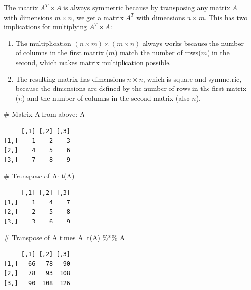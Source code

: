 \documentclass[
  letterpaper,
  DIV=11,
  numbers=noendperiod]{scrartcl}
\newenvironment{Shaded}{\begin{snugshade}}{\end{snugshade}}
\newcommand{\CommentTok}[1]{\textcolor[rgb]{0.37,0.37,0.37}{#1}}
\newcommand{\FunctionTok}[1]{\textcolor[rgb]{0.28,0.35,0.67}{#1}}
\newcommand{\NormalTok}[1]{\textcolor[rgb]{0.00,0.23,0.31}{#1}}
\newcommand{\SpecialCharTok}[1]{\textcolor[rgb]{0.37,0.37,0.37}{#1}}
\begin{document}
The matrix \(A^T \times A\) is always symmetric because by transposing
any matrix \(A\) with dimensions \(m \times n\), we get a matrix \(A^T\)
with dimensions \(n \times m\). This has two implications for
multiplying \(A^T \times A\):

\begin{enumerate}
\def\labelenumi{\arabic{enumi}.}
\item
  The multiplication \((n \times m) \times (m \times n)\) always works
  because the number of columns in the first matrix (\(m\)) match the
  number of rows(\(m\)) in the second, which makes matrix multiplication
  possible.
\item
  The resulting matrix has dimensions \(n \times n\), which is square
  and symmetric, because the dimensions are defined by the number of
  rows in the first matrix (\(n\)) and the number of columns in the
  second matrix (also \(n\)).
\end{enumerate}

\begin{Shaded}
\begin{Highlighting}[]
\CommentTok{\# Matrix A from above:}
\NormalTok{A}
\end{Highlighting}
\end{Shaded}

\begin{verbatim}
     [,1] [,2] [,3]
[1,]    1    2    3
[2,]    4    5    6
[3,]    7    8    9
\end{verbatim}

\begin{Shaded}
\begin{Highlighting}[]
\CommentTok{\# Transpose of A:}
\FunctionTok{t}\NormalTok{(A)}
\end{Highlighting}
\end{Shaded}

\begin{verbatim}
     [,1] [,2] [,3]
[1,]    1    4    7
[2,]    2    5    8
[3,]    3    6    9
\end{verbatim}

\begin{Shaded}
\begin{Highlighting}[]
\CommentTok{\# Transpose of A times A:}
\FunctionTok{t}\NormalTok{(A) }\SpecialCharTok{\%*\%}\NormalTok{ A}
\end{Highlighting}
\end{Shaded}

\begin{verbatim}
     [,1] [,2] [,3]
[1,]   66   78   90
[2,]   78   93  108
[3,]   90  108  126
\end{verbatim}
\end{document}
